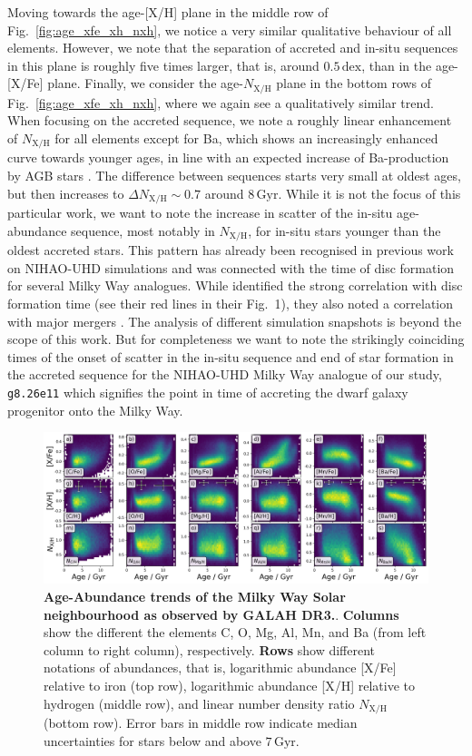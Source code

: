 \documentclass[fleqn,usenatbib]{mnras}
\begin{document}
Moving towards the age-[X/H] plane in the middle row of Fig.~\ref{fig:age_xfe_xh_nxh}, we notice a very similar qualitative behaviour of all elements. However, we note that the separation of accreted and in-situ sequences in this plane is roughly five times larger, that is, around $0.5\,\mathrm{dex}$, than in the age-[X/Fe] plane. Finally, we consider the age-$N_\mathrm{X/H}$ plane in the bottom rows of Fig.~\ref{fig:age_xfe_xh_nxh}, where we again see a qualitatively similar trend. When focusing on the accreted sequence, we note a roughly linear enhancement of $N_\mathrm{X/H}$ for all elements except for Ba, which shows an increasingly enhanced curve towards younger ages, in line with an expected increase of Ba-production by AGB stars \citep{Karakas2016}. The difference between sequences starts very small at oldest ages, but then increases to $\Delta N_\mathrm{X/H} \sim 0.7$ around $8\,\mathrm{Gyr}$. While it is not the focus of this particular work, we want to note the increase in scatter of the in-situ age-abundance sequence, most notably in $N_\mathrm{X/H}$, for in-situ stars younger than the oldest accreted stars. This pattern has already been recognised in previous work on NIHAO-UHD simulations \citep[e.g.][]{Lu2022} and was connected with the time of disc formation for several Milky Way analogues. While \citet{Lu2022} identified the strong correlation with disc formation time (see their red lines in their Fig.~1), they also noted a correlation with major mergers \citep[][see their orange lines in Fig.~1]{Lu2022}. The analysis of different simulation snapshots is beyond the scope of this work. But for completeness we want to note the strikingly coinciding times of the onset of scatter in the in-situ sequence and end of star formation in the accreted sequence for the NIHAO-UHD Milky Way analogue of our study, \texttt{g8.26e11} which signifies the point in time of accreting the dwarf galaxy progenitor onto the Milky Way.

\begin{figure}
	\includegraphics[width=\textwidth]{figures/age_xfe_xh_nxh_galah.png}
    \caption{
    \textbf{Age-Abundance trends of the Milky Way Solar neighbourhood as observed by GALAH DR3.}.
    \textbf{Columns} show the different the elements C, O, Mg, Al, Mn, and Ba (from left column to right column), respectively.
    \textbf{Rows} show different notations of abundances, that is, logarithmic abundance {[X/Fe]} relative to iron (top row), logarithmic abundance {[X/H]} relative to hydrogen (middle row), and linear number density ratio {$N_\mathrm{X/H}$} (bottom row). Error bars in middle row indicate median uncertainties for stars below and above $7\,\mathrm{Gyr}$.
    }
    \label{fig:age_xfe_xh_nxh_galah}
\end{figure}
\end{document}
